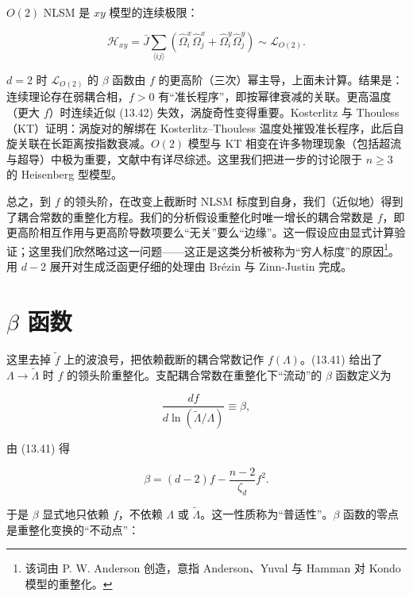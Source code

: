 $O(2)$ NLSM 是 $xy$ 模型的连续极限：

\begin{equation*}
\mathcal {H}_{xy} = \bar {J} \sum_{\langle ij \rangle} \left( \hat {\Omega} _ {i} ^ {x} \hat {\Omega} _ {j} ^ {x} + \hat {\Omega} _ {i} ^ {y} \hat {\Omega} _ {j} ^ {y} \right) \sim \mathcal {L}_{O ( 2 )}.
\tag{13.42}
\end{equation*}

$d=2$ 时 $\mathcal{L}_{O(2)}$ 的 $\beta$ 函数由 $f$ 的更高阶（三次）幂主导，上面未计算。结果是：连续理论存在弱耦合相，$f>0$ 有“准长程序”，即按幂律衰减的关联。更高温度（更大 $f$）时连续近似 (13.42) 失效，涡旋奇性变得重要。Kosterlitz 与 Thouless（KT）证明：涡旋对的解绑在 Kosterlitz--Thouless 温度处摧毁准长程序，此后自旋关联在长距离按指数衰减。$O(2)$ 模型与 KT 相变在许多物理现象（包括超流与超导）中极为重要，文献中有详尽综述。这里我们把进一步的讨论限于 $n \geq 3$ 的 Heisenberg 型模型。

总之，到 $f$ 的领头阶，在改变上截断时 NLSM 标度到自身，我们（近似地）得到了耦合常数的重整化方程。我们的分析假设重整化时唯一增长的耦合常数是 $f$，即更高阶相互作用与更高阶导数项要么“无关”要么“边缘”。这一假设应由显式计算验证；这里我们欣然略过这一问题——这正是这类分析被称为“穷人标度”的原因\footnote{该词由 P. W. Anderson 创造，意指 Anderson、Yuval 与 Hamman 对 Kondo 模型的重整化。}。用 $d-2$ 展开对生成泛函更仔细的处理由 Brézin 与 Zinn-Justin 完成。

\section{$\beta$ 函数}

这里去掉 $\tilde{f}$ 上的波浪号，把依赖截断的耦合常数记作 $f(\Lambda)$。(13.41) 给出了 $\Lambda \rightarrow \tilde{\Lambda}$ 时 $f$ 的领头阶重整化。支配耦合常数在重整化下“流动”的 $\beta$ 函数定义为

\begin{equation*}
\frac {d f}{d \ln ( \tilde {\Lambda} / \Lambda )} \equiv \beta ,
\tag{13.43}
\end{equation*}

由 (13.41) 得

\begin{equation*}
\beta = ( d - 2 ) f - \frac {n - 2}{\zeta_ {d}} f ^ {2}.
\tag{13.44}
\end{equation*}

于是 $\beta$ 显式地只依赖 $f$，不依赖 $\Lambda$ 或 $\tilde{\Lambda}$。这一性质称为“普适性”。$\beta$ 函数的零点是重整化变换的“不动点”：

